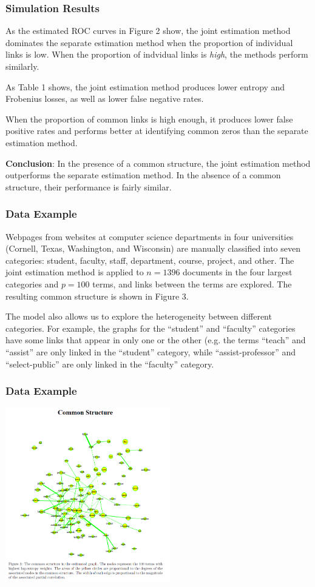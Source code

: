 \documentclass[t]{beamer}
\begin{document}
\begin{frame}
\frametitle{Simulation Results}
As the estimated ROC curves in Figure 2 show, the joint estimation method dominates the separate estimation method when the proportion of individual links is low. When the proportion of indvidual links is \textit{high}, the methods perform similarly.
\bigskip
\pause

As Table 1 shows, the joint estimation method produces lower entropy and Frobenius losses, as well as lower false negative rates.
\bigskip
\pause 

When the proportion of common links is high enough, it produces lower false positive rates and performs better at identifying common zeros than the separate estimation method.

\bigskip
\pause
\textbf{Conclusion}: In the presence of a common structure, the joint estimation method outperforms the separate estimation method. In the absence of a common structure, their performance is fairly similar.
\end{frame}
\begin{frame}
\frametitle{Data Example}
Webpages from websites at computer science departments in four universities (Cornell, Texas, Washington, and Wisconsin) are manually classified into seven categories: student, faculty, staff, department, course, project, and other. The joint estimation method is applied to $n = 1396$ documents in the four largest categories and $p = 100$ terms, and links between the terms are explored. The resulting common structure is shown in Figure 3.
\bigskip
\pause

The model also allows us to explore the heterogeneity between different categories. For example, the graphs for the ``student'' and ``faculty'' categories have some links that appear in only one or the other (e.g. the terms ``teach'' and ``assist'' are only linked in the ``student'' category, while ``assist-professor'' and ``select-public'' are only linked in the ``faculty'' category.
\end{frame}


\begin{frame}
\frametitle{Data Example}
\centering
\includegraphics[height=3in]{guodata.png}
\end{frame}
\end{document}
